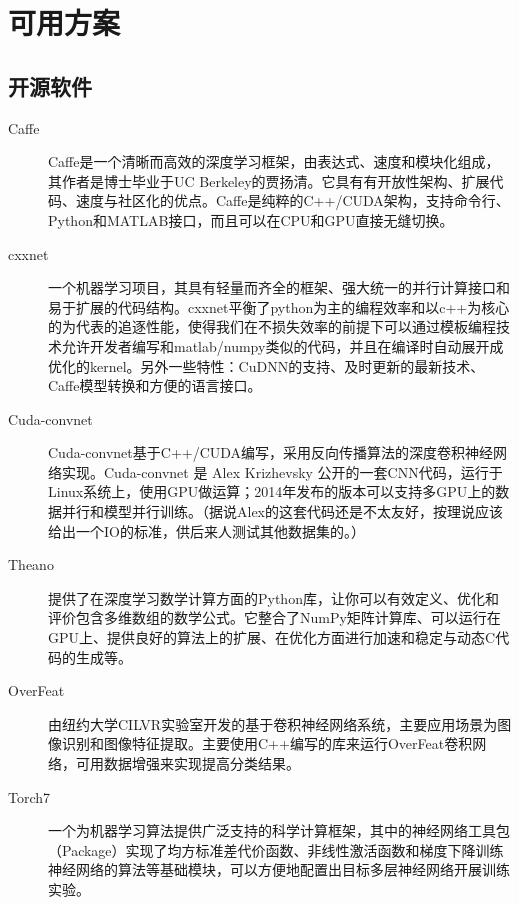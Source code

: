 \section{可用方案}
\subsection{开源软件}
\begin{description}
\item[Caffe] Caffe是一个清晰而高效的深度学习框架，由表达式、速度和模块化组成，其作者是博士毕业于UC Berkeley的贾扬清。它具有有开放性架构、扩展代码、速度与社区化的优点。Caffe是纯粹的C++/CUDA架构，支持命令行、Python和MATLAB接口，而且可以在CPU和GPU直接无缝切换。

\item[cxxnet] 一个机器学习项目，其具有轻量而齐全的框架、强大统一的并行计算接口和易于扩展的代码结构。cxxnet平衡了python为主的编程效率和以c++为核心的为代表的追逐性能，使得我们在不损失效率的前提下可以通过模板编程技术允许开发者编写和matlab/numpy类似的代码，并且在编译时自动展开成优化的kernel。另外一些特性：CuDNN的支持、及时更新的最新技术、Caffe模型转换和方便的语言接口。

\item[Cuda-convnet] Cuda-convnet基于C++/CUDA编写，采用反向传播算法的深度卷积神经网络实现。Cuda-convnet 是 Alex Krizhevsky 公开的一套CNN代码，运行于Linux系统上，使用GPU做运算；2014年发布的版本可以支持多GPU上的数据并行和模型并行训练。（据说Alex的这套代码还是不太友好，按理说应该给出一个IO的标准，供后来人测试其他数据集的。）

\item[Theano] 提供了在深度学习数学计算方面的Python库，让你可以有效定义、优化和评价包含多维数组的数学公式。它整合了NumPy矩阵计算库、可以运行在GPU上、提供良好的算法上的扩展、在优化方面进行加速和稳定与动态C代码的生成等。

\item[OverFeat] 由纽约大学CILVR实验室开发的基于卷积神经网络系统，主要应用场景为图像识别和图像特征提取。主要使用C++编写的库来运行OverFeat卷积网络，可用数据增强来实现提高分类结果。

\item[Torch7] 一个为机器学习算法提供广泛支持的科学计算框架，其中的神经网络工具包（Package）实现了均方标准差代价函数、非线性激活函数和梯度下降训练神经网络的算法等基础模块，可以方便地配置出目标多层神经网络开展训练实验。
\end{description}

